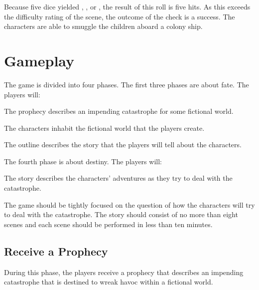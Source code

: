 \documentclass[12pt, a5paper, parskip=half-]{scrartcl}
\begin{document}
Because five dice yielded ,  , or , the result of this roll is five hits.
As this exceeds the difficulty rating of the scene, the outcome of the check is a success.
The characters are able to smuggle the children aboard a colony ship.

\newpage

\section*{Gameplay} \label{section:gameplay}
The game is divided into four phases.
The first three phases are about fate.
The players will:
\begin{description}[labelindent=0.25cm, leftmargin=\widthof{\hspace{0.25cm}\textbullet\space}, font=\normalfont\textbullet\bfseries\cinzel\small\space]
  \item[{\hyperref[subsection:receive-a-prophecy]{Receive a Prophecy}:}] The prophecy describes an impending catastrophe for some fictional world.
  \item[{\hyperref[subsection:create-characters]{Create Characters}:}] The characters inhabit the fictional world that the players create.
  \item[{\hyperref[subsection:write-an-outline]{Write an Outline}:}] The outline describes the story that the players will tell about the characters.
\end{description}

The fourth phase is about destiny.
The players will:
\begin{description}[labelindent=0.25cm, leftmargin=\widthof{\hspace{0.25cm}\textbullet\space}, font=\normalfont\textbullet\bfseries\cinzel\small\space]
	\item[{\hyperref[subsection:tell-the-story]{Tell the Story}:}] The story describes the characters' adventures as they try to deal with the catastrophe.
\end{description}

\bigskip

The game should be tightly focused on the question of how the characters will try to deal with the catastrophe.
The story should consist of no more than eight scenes and each scene should be performed in less than ten minutes. 

\subsection*{Receive a Prophecy} \label{subsection:receive-a-prophecy}
During this phase, the players receive a prophecy that describes an impending catastrophe that is destined to wreak havoc within a fictional world.
\end{document}
